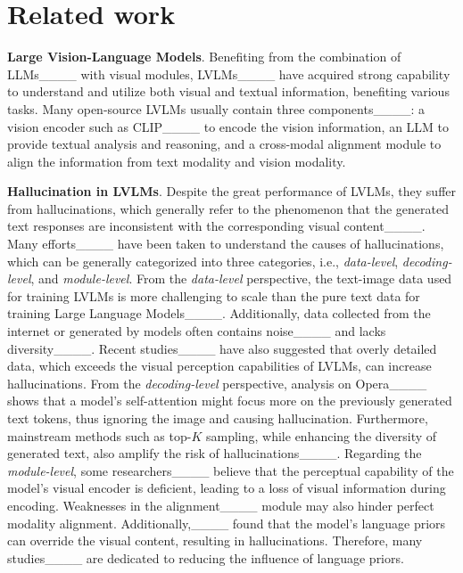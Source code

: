 \section{Related work}
\noindent\textbf{Large Vision-Language Models}. 
Benefiting from the combination of LLMs____ with visual modules, LVLMs____ have acquired strong capability to understand and utilize both visual and textual information, benefiting various tasks. Many open-source LVLMs usually contain three components____: a vision encoder such as CLIP____ to encode the vision information, an LLM to provide textual analysis and reasoning, and a cross-modal alignment module to align the information from text modality and vision modality.




\noindent\textbf{Hallucination in LVLMs}. Despite the great performance of LVLMs, they suffer from hallucinations, which generally refer to the phenomenon that the generated text responses are inconsistent with the corresponding visual content____. Many efforts____ have been taken to understand the causes of hallucinations, which can be generally categorized into three categories, i.e., \textit{data-level}, \textit{decoding-level}, and \textit{module-level}. From the \textit{data-level} perspective, the text-image data used for training LVLMs is more challenging to scale than the pure text data for training Large Language Models____. Additionally, data collected from the internet or generated by models often contains noise____ and lacks diversity____. Recent studies____ have also suggested that overly detailed data, which exceeds the visual perception capabilities of LVLMs, can increase hallucinations. From the \textit{decoding-level} perspective, 
analysis on Opera____ shows that a model's self-attention might focus more on the previously generated text tokens, thus ignoring the image and causing hallucination. Furthermore, mainstream methods such as top-$K$ sampling, while enhancing the diversity of generated text, also amplify the risk of hallucinations____. Regarding the \textit{module-level}, some researchers____ believe that the perceptual capability of the model's visual encoder is deficient, leading to a loss of visual information during encoding. Weaknesses in the alignment____ module may also hinder perfect modality alignment. Additionally,____ found that the model's language priors can override the visual content, resulting in hallucinations. Therefore, many studies____ are dedicated to reducing the influence of language priors. 


